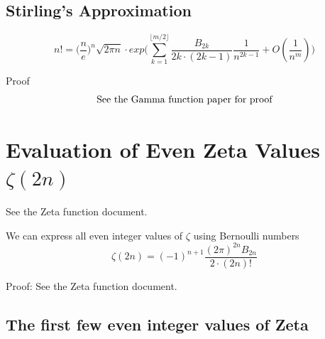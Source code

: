\documentclass[a4paper]{article}
\begin{document}
\subsection{Stirling's Approximation}\label{bn:subsec:stirling's-approximation}
\begin{theorem}

    \begin{equation}
        n! = \Big( \frac{n}{e} \Big)^{n} \sqrt{2 \pi n} \cdot exp\Bigg(\sum_{k=1}^{\lfloor m/2 \rfloor} \frac{B_{2k}}{2k \cdot (2k-1)}  \frac{1}{n^{2k-1}} + O(\frac{1}{n^{m}})\Bigg)\label{bn:eq:equation8}
    \end{equation}


    Proof
    \begin{gather*}
        \intertext{See the Gamma function paper for proof}
    \end{gather*}
\end{theorem}

\pagebreak


\section{Evaluation of Even Zeta Values \texorpdfstring{$\zeta(2n)$}{zeta(2n)}}\label{bn:sec:connection-to-zeta-2n}

See the Zeta function document.

\begin{theorem}
    We can express all even integer values of $\zeta$ using Bernoulli numbers
    \begin{equation}
        \label{bn:eq:even-zeta}
        \zeta(2n) = (-1)^{n+1} \frac{(2\pi)^{2n} B_{2n}}{2 \cdot (2n)!}
    \end{equation}

    Proof:
    See the Zeta function document.
\end{theorem}

\subsection{The first few even integer values of Zeta}\label{bn:subsec:the-first-few-even-integer-values-of-zeta}
\end{document}
